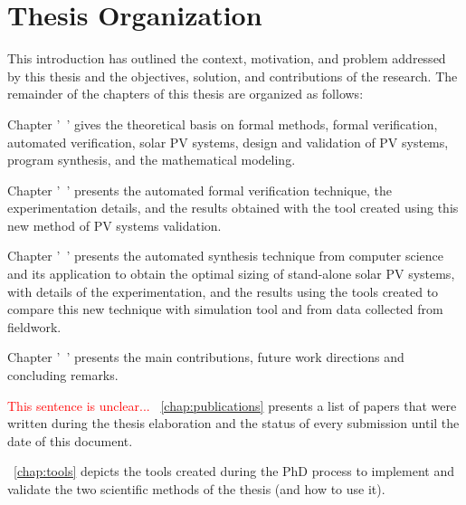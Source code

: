 \section{Thesis Organization}

This introduction has outlined the context, motivation, and problem addressed by this thesis and the objectives, solution, and contributions of the research. The remainder of the chapters of this thesis are organized as follows:

Chapter '~' gives the theoretical basis on formal methods, formal verification, automated verification, solar PV systems, design and validation of PV systems, program synthesis, and the mathematical modeling. 

Chapter '~' presents the automated formal verification technique, the experimentation details, and the results obtained with the tool created using this new method of PV systems validation. 

Chapter '~' presents the automated synthesis technique from computer science and its application to obtain the optimal sizing of stand-alone solar PV systems, with details of the experimentation, and the results using the tools created to compare this new technique with simulation tool and from data collected from fieldwork. 

Chapter '~' presents the main contributions, future work directions and concluding remarks.

\textcolor{red}{This sentence is unclear...}
~\autoref{chap:publications} presents a list of papers that were written during the thesis elaboration and the status of every submission until the date of this document.

~\autoref{chap:tools} depicts the tools created during the PhD process to implement and validate the two scientific methods of the thesis (and how to use it).